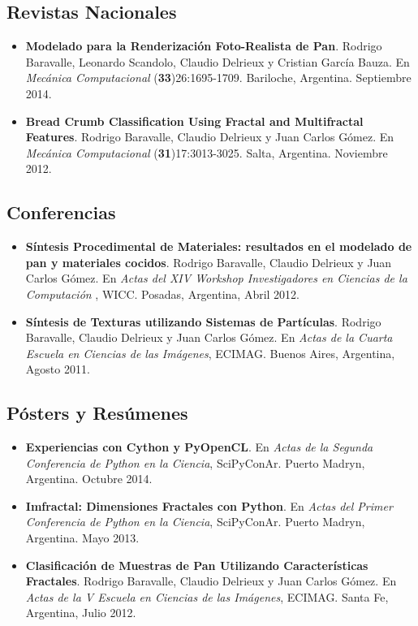 \subsection*{Revistas Nacionales}

\begin{itemize}
\item {\bf Modelado para la Renderización Foto-Realista de Pan}. Rodrigo Baravalle, Leonardo Scandolo, Claudio Delrieux y Cristian García Bauza. En {\it Mecánica Computacional} ({\bf 33})26:1695-1709. Bariloche, Argentina. Septiembre 2014.
\item {\bf Bread Crumb Classification Using Fractal and Multifractal Features}. Rodrigo Baravalle, Claudio Delrieux y Juan Carlos G\'omez. En {\it Mecánica Computacional} ({\bf 31})17:3013-3025. Salta, Argentina. Noviembre 2012.
\end{itemize}


\subsection*{Conferencias}
\begin{itemize}
\item {\bf Síntesis Procedimental de Materiales: resultados en el modelado de pan y materiales cocidos}. Rodrigo Baravalle, Claudio Delrieux y Juan Carlos G\'omez. En {\it Actas del XIV Workshop Investigadores en Ciencias de la Computación }, WICC. Posadas, Argentina, Abril 2012.
\item {\bf Síntesis de Texturas utilizando Sistemas de Partículas}. Rodrigo Baravalle, Claudio Delrieux y Juan Carlos G\'omez. En {\it Actas de la Cuarta Escuela en Ciencias de las Imágenes}, ECIMAG. Buenos Aires, Argentina, Agosto 2011.
\end{itemize}

\subsection*{Pósters y Resúmenes}
\begin{itemize}
\item {\bf Experiencias con Cython y PyOpenCL}. En {\it Actas de la Segunda Conferencia de Python en la Ciencia}, SciPyConAr. Puerto Madryn, Argentina. Octubre 2014.
\item {\bf Imfractal: Dimensiones Fractales con Python}.  En {\it Actas del Primer Conferencia de Python en la Ciencia}, SciPyConAr. Puerto Madryn, Argentina. Mayo 2013.
\item {\bf Clasificación de Muestras de Pan Utilizando Características Fractales}. Rodrigo Baravalle, Claudio Delrieux y Juan Carlos G\'omez. En {\it Actas de la V Escuela en Ciencias de las Imágenes}, ECIMAG. Santa Fe, Argentina, Julio 2012.
\end{itemize}



